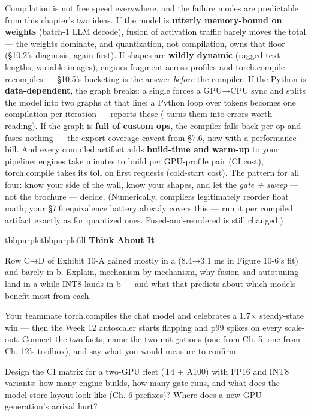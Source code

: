Compilation is not free speed everywhere, and the failure modes are predictable from this chapter's two ideas. If the model is \textbf{utterly memory-bound on weights} (batch-1 LLM decode), fusion of activation traffic barely moves the total — the weights dominate, and quantization, not compilation, owns that floor (§10.2's diagnosis, again first). If shapes are \textbf{wildly dynamic} (ragged text lengths, variable images), engines fragment across profiles and torch.compile recompiles — §10.5's bucketing is the answer \textit{before} the compiler. If the Python is \textbf{data-dependent}, the graph breaks: a single  forces a GPU→CPU sync and splits the model into two graphs at that line; a Python loop over tokens becomes one compilation per iteration —  reports these ( turns them into errors worth reading). If the graph is \textbf{full of custom ops}, the compiler falls back per-op and fuses nothing — the export-coverage caveat from §7.6, now with a performance bill. And every compiled artifact adds \textbf{build-time and warm-up} to your pipeline: engines take minutes to build per GPU-profile pair (CI cost), torch.compile takes its toll on first requests (cold-start cost). The pattern for all four: know your side of the wall, know your shapes, and let the \textit{gate + sweep} — not the brochure — decide. (Numerically, compilers legitimately reorder float math; your §7.6 equivalence battery already covers this — run it per compiled artifact exactly as for quantized ones. Fused-and-reordered is still changed.)

\begin{calloutbox}{tbbpurple}{tbbpurplefill}
{\normalsize\bfseries\color{tbbpurple}Think About It}\par\vspace{3pt}
\begin{tbbitemize}
  \item Row C→D of Exhibit 10-A gained mostly in a (8.4→3.1 ms in Figure 10-6's fit) and barely in b. Explain, mechanism by mechanism, why fusion and autotuning land in a while INT8 lands in b — and what that predicts about which models benefit most from each.
  \item Your teammate torch.compiles the chat model and celebrates a 1.7× steady-state win — then the Week 12 autoscaler starts flapping and p99 spikes on every scale-out. Connect the two facts, name the two mitigations (one from Ch. 5, one from Ch. 12's toolbox), and say what you would measure to confirm.
  \item Design the CI matrix for a two-GPU fleet (T4 + A100) with FP16 and INT8 variants: how many engine builds, how many gate runs, and what does the model-store layout look like (Ch. 6 prefixes)? Where does a new GPU generation's arrival hurt?
\end{tbbitemize}
\end{calloutbox}

